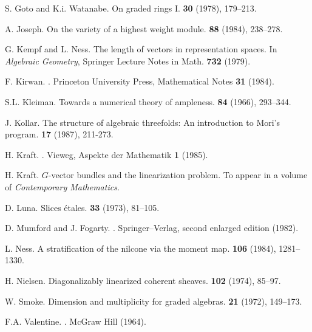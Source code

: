 \documentclass{article}
\begin{document}
\begin{thebibliography}{25}
  {\sc S. Goto and K.i. Watanabe.}
  \newblock On graded rings I.
   \textbf{30} (1978), 179--213.

  {\sc A. Joseph.}
  \newblock On the variety of a highest weight module.
   \textbf{88} (1984), 238--278.

  {\sc G. Kempf and L. Ness.}
  \newblock The length of vectors in representation spaces.
  \newblock In {\em Algebraic Geometry}, Springer Lecture Notes in Math. \textbf{732} (1979).

  {\sc F. Kirwan.}
  .
  \newblock Princeton University Press, Mathematical Notes \textbf{31} (1984).

  {\sc S.L. Kleiman.}
  \newblock Towards a numerical theory of ampleness.
   \textbf{84} (1966), 293--344.

  {\sc J. Kollar.}
  \newblock The structure of algebraic threefolds: An introduction to Mori's program.
   \textbf{17} (1987), 211-273.

  {\sc H. Kraft.}
  .
  \newblock Vieweg, Aspekte der Mathematik \textbf{1} (1985).

  {\sc H. Kraft.}
  \newblock $G$-vector bundles and the linearization problem.
  \newblock To appear in a volume of {\em Contemporary Mathematics}.

  {\sc D. Luna.}
  \newblock Slices \'{e}tales.
   \textbf{33} (1973), 81--105.

  {\sc D. Mumford and J. Fogarty.}
  .
  \newblock Springer--Verlag, second enlarged edition (1982).

  {\sc L. Ness.}
  \newblock A stratification of the nilcone via the moment map.
   \textbf{106} (1984), 1281--1330.

  {\sc H. Nielsen.}
  \newblock Diagonalizably linearized coherent sheaves.
   \textbf{102} (1974), 85--97.

  {\sc W. Smoke.}
  \newblock Dimension and multiplicity for graded algebras.
   \textbf{21} (1972), 149--173.

  {\sc F.A. Valentine.}
  .
  \newblock McGraw Hill (1964).

\end{thebibliography}
\end{document}
